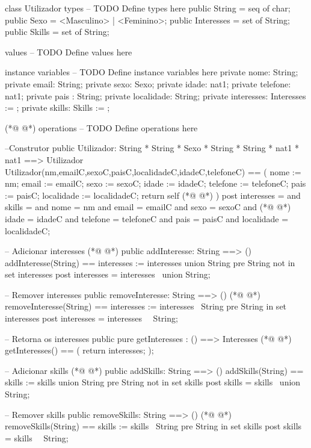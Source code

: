 \begin{vdmpp}[breaklines=true]
class Utilizador
types
-- TODO Define types here
 public String = seq of char;
 public Sexo = <Masculino> | <Feminino>;
 public Interesses = set of String;
 public Skills = set of String;
 
values
-- TODO Define values here

instance variables
-- TODO Define instance variables here
 private nome: String;
 private email: String;
 private sexo: Sexo;
 private idade: nat1;
 private telefone: nat1;
 private pais : String;
 private localidade: String;
 private interesses: Interesses := {};
 private skills: Skills := {};
 
(*@
\label{Utilizador:24}
@*)
operations
-- TODO Define operations here

 --Construtor
 public Utilizador: String * String * Sexo * String * String * nat1 * nat1 ==> Utilizador
 Utilizador(nm,emailC,sexoC,paisC,localidadeC,idadeC,telefoneC) == (
  nome := nm;
  email := emailC;
  sexo := sexoC;
  idade := idadeC;
  telefone := telefoneC;
  pais := paisC;
  localidade := localidadeC;
  return self
(*@
\label{addInteresse:38}
@*)
 )
 post interesses = {} and
   skills = {} and
   nome = nm and
   email = emailC and
   sexo = sexoC and
(*@
\label{removeInteresse:44}
@*)
   idade = idadeC and
   telefone = telefoneC and
   pais = paisC and
   localidade = localidadeC;
 
 -- Adicionar interesses
(*@
\label{getInteresses:50}
@*)
 public addInteresse: String ==> ()
 addInteresse(String) == interesses := interesses union {String}
 pre String not in set interesses
 post interesses = interesses~ union {String};
 
 -- Remover interesses
 public removeInteresse: String ==> ()
(*@
\label{addSkills:57}
@*)
 removeInteresse(String) == interesses := interesses \ {String}
 pre String in set interesses
 post interesses = interesses~ \ {String};
 
 -- Retorna os interesses
 public pure getInteresses : () ==> Interesses
(*@
\label{removeSkills:63}
@*)
 getInteresses() ==
 (
  return interesses;
 );
 
 -- Adicionar skills
(*@
\label{getSkills:69}
@*)
 public addSkills: String ==> ()
 addSkills(String) == skills := skills union {String}
 pre String not in set skills
 post skills = skills~ union {String};
 
 -- Remover skills
 public removeSkills: String ==> ()
(*@
\label{getNome:76}
@*)
 removeSkills(String) == skills := skills \ {String}
 pre String in set skills
 post skills = skills~ \ {String};
 

\end{vdmpp}
